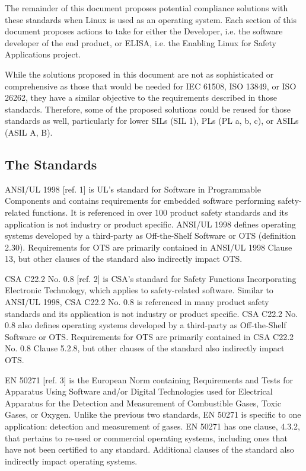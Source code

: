 \documentclass[12pt]{../Common_files/ElisaPaper}
\begin{document}
The remainder of this document proposes potential compliance solutions with these standards when Linux is used as an operating system.  Each section of this document proposes actions to take for either the Developer, i.e. the software developer of the end product, or ELISA, i.e. the Enabling Linux for Safety Applications project. 

While the solutions proposed in this document are not as sophisticated or comprehensive as those that would be needed for IEC 61508, ISO 13849, or ISO 26262, they have a similar objective to the requirements described in those standards.  Therefore, some of the proposed solutions could be reused for those standards as well, particularly for lower SILs (SIL 1), PLs (PL a, b, c), or ASILs (ASIL A, B).

\subsection{The Standards}
ANSI/UL 1998 [ref. 1] is UL's standard for Software in Programmable Components and contains requirements for embedded software performing safety-related functions.  It is referenced in over 100 product safety standards and its application is not industry or product specific.  ANSI/UL 1998 defines operating systems developed by a third-party as Off-the-Shelf Software or OTS (definition 2.30).  Requirements for OTS are primarily contained in ANSI/UL 1998 Clause 13, but other clauses of the standard also indirectly impact OTS.

CSA C22.2 No. 0.8 [ref. 2] is CSA's standard for Safety Functions Incorporating Electronic Technology, which applies to safety-related software.  Similar to ANSI/UL 1998, CSA C22.2 No. 0.8 is referenced in many product safety standards and its application is not industry or product specific.  CSA C22.2 No. 0.8 also defines operating systems developed by a third-party as Off-the-Shelf Software or OTS.  Requirements for OTS are primarily contained in CSA C22.2 No. 0.8 Clause 5.2.8, but other clauses of the standard also indirectly impact OTS.

EN 50271 [ref. 3] is the European Norm containing Requirements and Tests for Apparatus Using Software and/or Digital Technologies used for Electrical Apparatus for the Detection and Measurement of Combustible Gases, Toxic Gases, or Oxygen.  Unlike the previous two standards, EN 50271 is specific to one application: detection and measurement of gases.  EN 50271 has one clause, 4.3.2, that pertains to re-used or commercial operating systems, including ones that have not been certified to any standard.  Additional clauses of the standard also indirectly impact operating systems.
\end{document}
